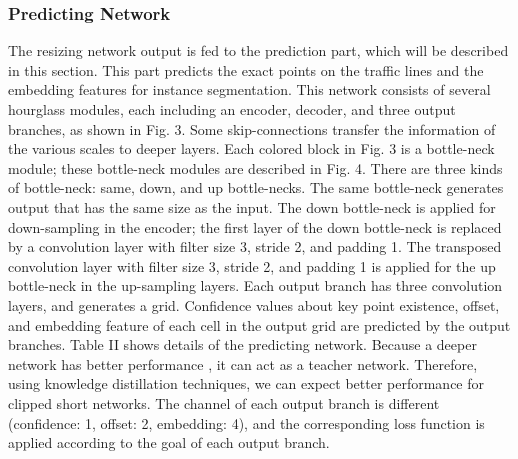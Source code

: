 \documentclass[journal]{IEEEtran}
\begin{document}
\subsubsection{Predicting Network}
The resizing network output is fed to the prediction part, which will be described in this section. This part predicts the exact points on the traffic lines and the embedding features for instance segmentation. This network consists of several hourglass modules, each including an encoder, decoder, and three output branches, as shown in Fig. 3. Some skip-connections transfer the information of the various scales to deeper layers. Each colored block in Fig. 3 is a bottle-neck module; these bottle-neck modules are described in Fig. 4. There are three kinds of bottle-neck: same, down, and up bottle-necks. The same bottle-neck generates output that has the same size as the input. The down bottle-neck is applied for down-sampling in the encoder; the first layer of the down bottle-neck is replaced by a convolution layer with filter size 3, stride 2, and padding 1. The transposed convolution layer with filter size 3, stride 2, and padding 1 is applied for the up bottle-neck in the up-sampling layers. Each output branch has three convolution layers, and generates a  grid. Confidence values about key point existence, offset, and embedding feature of each cell in the output grid are predicted by the output branches. Table II shows details of the predicting network. Because a deeper network has better performance \cite{newell2016stacked}, it can act as a teacher network. Therefore, using knowledge distillation techniques, we can expect better performance for clipped short networks. The channel of each output branch is different (confidence: 1, offset: 2, embedding: 4), and the corresponding loss function is applied according to the goal of each output branch.
\end{document}
